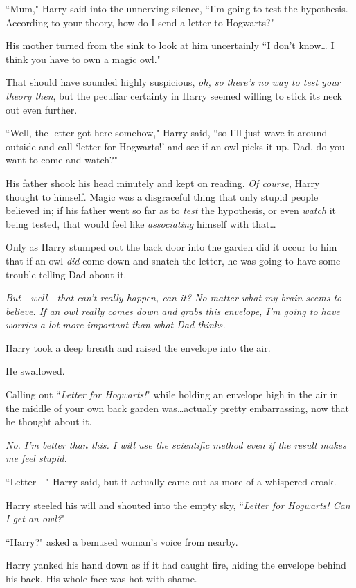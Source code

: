 ``Mum," Harry said into the unnerving silence, ``I'm going to test the hypothesis. According to your theory, how do I send a letter to Hogwarts?"

His mother turned from the sink to look at him uncertainly ``I don't know{\ldots} I think you have to own a magic owl."

That should have sounded highly suspicious, \emph{oh, so there's no way to test your theory then}, but the peculiar certainty in Harry seemed willing to stick its neck out even further.

``Well, the letter got here somehow," Harry said, ``so I'll just wave it around outside and call `letter for Hogwarts!' and see if an owl picks it up. Dad, do you want to come and watch?"

His father shook his head minutely and kept on reading. \emph{Of course}, Harry thought to himself. Magic was a disgraceful thing that only stupid people believed in; if his father went so far as to \emph{test} the hypothesis, or even \emph{watch} it being tested, that would feel like \emph{associating} himself with that{\ldots}

Only as Harry stumped out the back door into the garden did it occur to him that if an owl \emph{did} come down and snatch the letter, he was going to have some trouble telling Dad about it.

\emph{But---well---that can't \emph{really} happen, can it? No matter what my brain seems to believe. If an owl really comes down and grabs this envelope, I'm going to have worries a lot more important than what Dad thinks.}

Harry took a deep breath and raised the envelope into the air.

He swallowed.

Calling out ``\emph{Letter for Hogwarts!}" while holding an envelope high in the air in the middle of your own back garden was{\ldots}actually pretty embarrassing, now that he thought about it.

\emph{No. I'm better than this. I will use the scientific method even if the result makes me feel stupid.}

``Letter---" Harry said, but it actually came out as more of a whispered croak.

Harry steeled his will and shouted into the empty sky, ``\emph{Letter for Hogwarts! Can I get an owl?}"

``Harry?" asked a bemused woman's voice from nearby.

Harry yanked his hand down as if it had caught fire, hiding the envelope behind his back. His whole face was hot with shame.

